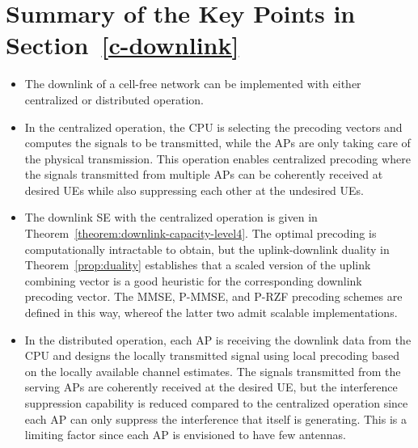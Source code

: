 \newpage

\section{Summary of the Key Points in Section~\ref{c-downlink}}
\label{c-downlink-summary}

\begin{mdframed}[style=GrayFrame]

\begin{itemize}
\item The downlink of a cell-free network can be implemented with either centralized or distributed operation.

\item In the centralized operation, the CPU is selecting the precoding vectors and computes the signals to be transmitted, while the APs are only taking care of the physical transmission. This operation enables centralized precoding where the signals transmitted from multiple APs can be coherently received at desired UEs while also suppressing each other at the undesired UEs.

\item The downlink SE with the centralized operation is given in Theorem~\ref{theorem:downlink-capacity-level4}. The optimal precoding is computationally intractable to obtain, but the uplink-downlink duality in Theorem~\ref{prop:duality} establishes that a scaled version of the uplink combining vector is a good heuristic for the corresponding downlink precoding vector. The MMSE, P-MMSE, and P-RZF precoding schemes are defined in this way, whereof the latter two admit scalable implementations.

\item In the distributed operation, each AP is receiving the downlink data from the CPU and designs the locally transmitted signal using local precoding based on the locally available channel estimates. 
The signals transmitted from the serving APs are coherently received at the desired UE, but the interference suppression capability is reduced compared to the centralized operation since each AP can only suppress the interference that itself is generating. This is a limiting factor since each AP is envisioned to have few antennas.

\end{itemize}

\end{mdframed}

\newpage

